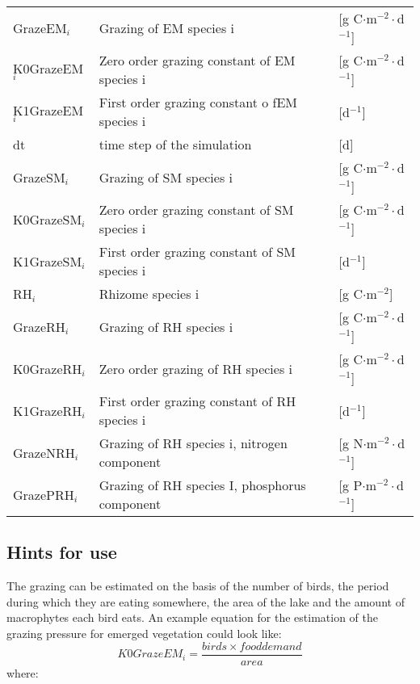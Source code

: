 \begin{tabular}{lll}
GrazeEM$_i$        & Grazing of EM species i                         & [g C$\cdot$m$^{-2}\cdot$d$^{-1}$] \\
K0GrazeEM$_i$      & Zero order grazing constant of EM species i     & [g C$\cdot$m$^{-2}\cdot$d$^{-1}$] \\
K1GrazeEM$_i$      & First order grazing constant o fEM species i    & [d$^{-1}$]                        \\
dt                 & time step of the simulation                     & [d]                               \\
GrazeSM$_i$        & Grazing of SM species i                         & [g C$\cdot$m$^{-2}\cdot$d$^{-1}$] \\
K0GrazeSM$_i$      & Zero order grazing constant of SM species i     & [g C$\cdot$m$^{-2}\cdot$d$^{-1}$] \\
K1GrazeSM$_i$      & First order grazing constant of SM species i    & [d$^{-1}$]                        \\
RH$_i$             & Rhizome species i                               & [g C$\cdot$m$^{-2}$]              \\
GrazeRH$_i$        & Grazing of RH species i                         & [g C$\cdot$m$^{-2}\cdot$d$^{-1}$] \\
K0GrazeRH$_i$      & Zero order grazing of RH species i              & [g C$\cdot$m$^{-2}\cdot$d$^{-1}$] \\
K1GrazeRH$_i$      & First order grazing constant of RH species i    & [d$^{-1}$]                        \\
GrazeNRH$_i$       & Grazing of RH species i, nitrogen component     & [g N$\cdot$m$^{-2}\cdot$d$^{-1}$] \\
GrazePRH$_i$       & Grazing of RH species I, phosphorus component   & [g P$\cdot$m$^{-2}\cdot$d$^{-1}$] \\
\end{tabular}

\subsection{Hints for use}
The grazing can be estimated on the basis of the number of birds, the period during which they are eating somewhere, the area of the lake and the amount of macrophytes each bird eats.
An example equation for the estimation of the grazing pressure for emerged vegetation could look like:
%
\begin{equation}
K0GrazeEM_i = \frac{birds \times fooddemand}{area}
\end{equation}
%
where:

